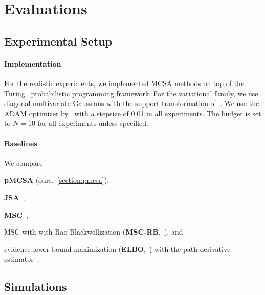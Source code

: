 \vspace{-0.1in}
\section{Evaluations}\label{section:eval}
\vspace{-0.1in}
\subsection{Experimental Setup}
\vspace{-0.05in}
\paragraph{Implementation}
For the realistic experiments, we implemented MCSA methods on top of the Turing~\citep{ge2018t} probabilistic programming framework.%
For the variational family, we use diagonal multivariate Gaussians with the support transformation of~\citet{JMLR:v18:16-107}.
We use the ADAM optimizer by~\citet{kingma_adam_2015} with a stepsize of 0.01 in all experiments.
The budget is set to \(N=10\) for all experiments unless specified.

\vspace{-0.1in}
\paragraph{Baselines}
We compare
\begin{enumerate*}[label=\textbf{(\roman*)}]
  \item \textbf{pMCSA} (ours,~\cref{section:pmcsa}),
  \item \textbf{JSA}~\citep{pmlr-v124-ou20a},
  \item \textbf{MSC}~\citep{NEURIPS2020_b2070693},
  \item MSC with with Rao-Blackwellization (\textbf{MSC-RB},~\citealt{NEURIPS2020_b2070693}), and
  \item evidence lower-bound maximization (\textbf{ELBO},~\citealt{pmlr-v33-ranganath14, JMLR:v18:16-107}) with the path derivative estimator~\citep{NIPS2017_e91068ff}.
\end{enumerate*}

\vspace{-0.1in}
\subsection{Simulations}\label{section:simulation}
\vspace{-0.1in}

